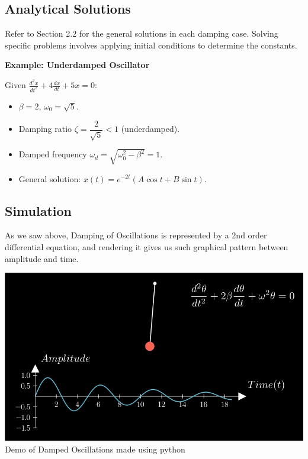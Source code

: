 \documentclass[12pt,a4paper]{article}
\begin{document}
\subsection{Analytical Solutions}

Refer to Section 2.2 for the general solutions in each damping case. Solving specific problems involves applying initial conditions to determine the constants.

\textbf{Example: Underdamped Oscillator}

Given \( \frac{d^2 x}{dt^2} + 4 \frac{dx}{dt} + 5 x = 0 \):

\begin{itemize}
    \item \( \beta = 2 \), \( \omega_0 = \sqrt{5} \).
    \item Damping ratio \( \zeta = \dfrac{2}{\sqrt{5}} < 1 \) (underdamped).
    \item Damped frequency \( \omega_d = \sqrt{\omega_0^2 - \beta^2} = 1 \).
    \item General solution: \( x(t) = e^{-2 t} (A \cos t + B \sin t) \).
\end{itemize}

\newpage
\subsection{Simulation}

As we saw above, Damping of Oscillations is represented by a 2nd order differential equation, and rendering it gives us such graphical pattern between amplitude and time.
\begin{center}
    \includegraphics[scale=0.3]{damped_shm}\\
    Demo of Damped Oscillations made using python
\end{center}
\end{document}

